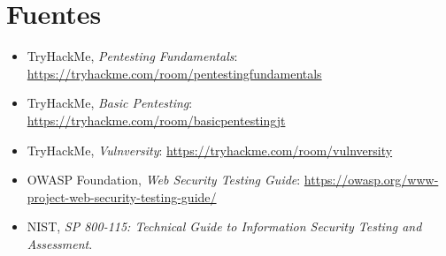 \documentclass[11pt,a4paper]{article}
\begin{document}
\section{Fuentes}
\begin{itemize}[leftmargin=*]
  \item TryHackMe, \textit{Pentesting Fundamentals}: \url{https://tryhackme.com/room/pentestingfundamentals}
  \item TryHackMe, \textit{Basic Pentesting}: \url{https://tryhackme.com/room/basicpentestingjt}
  \item TryHackMe, \textit{Vulnversity}: \url{https://tryhackme.com/room/vulnversity}
  \item OWASP Foundation, \textit{Web Security Testing Guide}: \url{https://owasp.org/www-project-web-security-testing-guide/}
  \item NIST, \textit{SP 800-115: Technical Guide to Information Security Testing and Assessment}.
\end{itemize}
\end{document}

